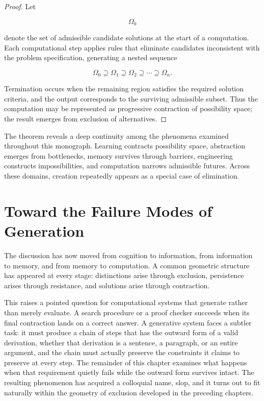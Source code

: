 \documentclass[11pt,oneside]{book}
\theoremstyle{plain}
\theoremstyle{definition}
\theoremstyle{remark}
\begin{document}
\begin{proof}
Let

\begin{equation}
\Omega_0
\end{equation}

denote the set of admissible candidate solutions at the start of a computation. Each computational step applies rules that eliminate candidates inconsistent with the problem specification, generating a nested sequence

\begin{equation}
\Omega_0
\supseteq
\Omega_1
\supseteq
\Omega_2
\supseteq
\cdots
\supseteq
\Omega_n.
\end{equation}

Termination occurs when the remaining region satisfies the required solution criteria, and the output corresponds to the surviving admissible subset. Thus the computation may be represented as progressive contraction of possibility space; the result emerges from exclusion of alternatives.
\end{proof}

The theorem reveals a deep continuity among the phenomena examined throughout this monograph. Learning contracts possibility space, abstraction emerges from bottlenecks, memory survives through barriers, engineering constructs impossibilities, and computation narrows admissible futures. Across these domains, creation repeatedly appears as a special case of elimination.

\section{Toward the Failure Modes of Generation}

The discussion has now moved from cognition to information, from information to memory, and from memory to computation. A common geometric structure has appeared at every stage: distinctions arise through exclusion, persistence arises through resistance, and solutions arise through contraction.

This raises a pointed question for computational systems that generate rather than merely evaluate. A search procedure or a proof checker succeeds when its final contraction lands on a correct answer. A generative system faces a subtler task: it must produce a chain of steps that has the outward form of a valid derivation, whether that derivation is a sentence, a paragraph, or an entire argument, and the chain must actually preserve the constraints it claims to preserve at every step. The remainder of this chapter examines what happens when that requirement quietly fails while the outward form survives intact. The resulting phenomenon has acquired a colloquial name, slop, and it turns out to fit naturally within the geometry of exclusion developed in the preceding chapters.
\end{document}
